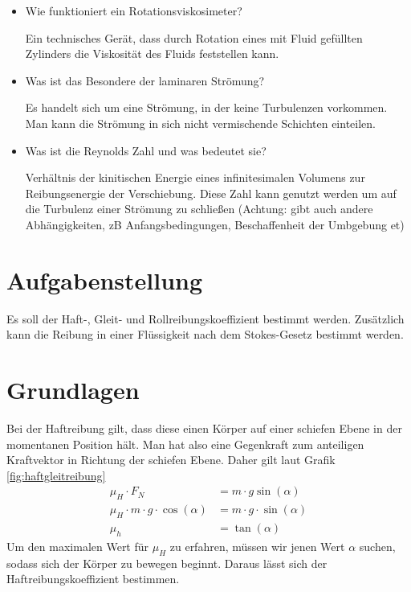 \documentclass{article}
\begin{document}
\begin{itemize}
\item Wie funktioniert ein Rotationsviskosimeter?

Ein technisches Gerät, dass durch Rotation eines mit Fluid gefüllten Zylinders die Viskosität des Fluids feststellen kann.


\item Was ist das Besondere der laminaren Strömung?

Es handelt sich um eine Strömung, in der keine Turbulenzen vorkommen. Man kann die Strömung in sich nicht vermischende Schichten einteilen.

\item Was ist die Reynolds Zahl und was bedeutet sie?

Verhältnis der kinitischen Energie eines infinitesimalen Volumens zur Reibungsenergie der Verschiebung. Diese Zahl kann genutzt werden um auf die Turbulenz einer Strömung zu schließen (Achtung: gibt auch andere Abhängigkeiten, zB Anfangsbedingungen, Beschaffenheit der Umbgebung et)

\end{itemize}

\newpage

\section{Aufgabenstellung}

Es soll der Haft-, Gleit- und Rollreibungskoeffizient bestimmt werden. Zusätzlich kann die Reibung in einer Flüssigkeit nach dem Stokes-Gesetz bestimmt werden.

\section{Grundlagen}

Bei der Haftreibung gilt, dass diese einen Körper auf einer schiefen Ebene in der momentanen Position hält. Man hat also eine Gegenkraft zum anteiligen Kraftvektor in Richtung der schiefen Ebene. Daher gilt laut Grafik \ref{fig:haftgleitreibung}
\begin{align}
\mu_H\cdot F_N &= m\cdot g \sin(\alpha) \\
\mu_H \cdot m\cdot g\cdot\cos(\alpha) &= m\cdot g \cdot \sin(\alpha) \\
\mu_h &= \tan(\alpha)
\end{align}
Um den maximalen Wert für $\mu_H$ zu erfahren, müssen wir jenen Wert $\alpha$ suchen, sodass sich der Körper zu bewegen beginnt. Daraus lässt sich der Haftreibungskoeffizient bestimmen.
\end{document}
